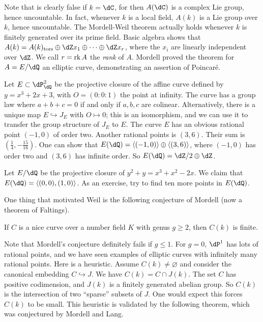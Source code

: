 \documentclass{article}
\begin{document}
Note that is clearly false if $k=\dC$, for then $A(\dC)$ is a complex Lie 
group, hence uncountable. In fact, whenever $k$ is a local field, $A(k)$ is a 
Lie group over $k$, hence uncountable. The Mordell-Weil theorem actually holds 
whenever $k$ is finitely generated over its prime field. Basic algebra shows 
that $A(k) = A(k)_\text{tors}\oplus \dZ x_1\oplus \cdots \oplus \dZ x_r$, where 
the $x_i$ are linearly independent over $\dZ$. We call $r=\operatorname{rk} A$ 
the \emph{rank} of $A$. Mordell proved the theorem for $A=E/\dQ$ an elliptic 
curve, demonstrating an assertion of Poincar\'e.

\begin{example}
Let $E\subset \dP_\dQ^2$ be the projective closure of the affine curve 
defined by $y=x^3+2 x+3$, with $O=(0:0:1)$ the point at infinity. The curve 
has a group law where $a+b+c=0$ if and only if $a,b,c$ are colinear. 
Alternatively, there is a unique map $E\hookrightarrow J_E$ with $O\mapsto 0$; 
this is an isomorphism, and we can use it to transfer the group structure of 
$J_E$ to $E$. The curve $E$ has an obvious rational point $(-1,0)$ of order 
two. Another rational points is $(3,6)$. Their sum is 
$\left(\frac 1 4,-\frac{15}{16}\right)$. One can show that 
$E(\dQ) = \langle (-1,0)\rangle \oplus \langle (3,6)\rangle$, where 
$(-1,0)$ has order two and $(3,6)$ has infinite order. So 
$E(\dQ) = \dZ/2\oplus \dZ$. 
\end{example}

\begin{example}
Let $E/\dQ$ be the projective closure of $y^2+y = x^3+x^2 - 2 x$. We claim 
that $E(\dQ) = \langle (0,0),(1,0)\rangle$. As an exercise, try to find ten 
more points in $E(\dQ)$. 
\end{example}

One thing that motivated Weil is the following conjecture of Mordell (now a 
theorem of Faltings). 

\begin{theorem}[Faltings]
If $C$ is a nice curve over a number field $K$ with genus $g\geqslant 2$, then 
$C(k)$ is finite.
\end{theorem}

Note that Mordell's conjecture definitely fails if $g\leqslant 1$. For $g=0$, 
$\dP^1$ has lots of rational points, and we have seen examples of 
elliptic curves with infinitely many rational points. Here is a heuristic. 
Assume $C(k)\ne\varnothing$ and consider the canonical embedding 
$C\hookrightarrow J$. We have $C(k)=C\cap J(k)$. The set $C$ has positive 
codimension, and $J(k)$ is a finitely generated abelian group. So 
$C(k)$ is the intersection of two ``sparse'' subsets of $J$. One would expect 
this forces $C(k)$ to be small. This heuristic is validated by the following 
theorem, which was conjectured by Mordell and Lang.
\end{document}
